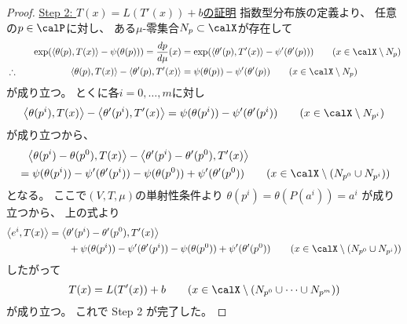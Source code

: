 \documentclass[report]{jlreq}
\begin{document}
\begin{proof}
    \uline{Step 2: $T(x) = L(T'(x)) + b$の証明} \quad
    指数型分布族の定義より、
    任意の$p \in \calP$に対し、
    ある$\mu$-零集合$N_p \subset \calX$が存在して
    \begin{alignat}{2}
        &\phantom{\therefore}& \quad
            \exp(\myangle{\theta(p)}{T(x)} - \psi(\theta(p)))
                =
                    \dd[p]{\mu}(x)
                &=
                    \exp(\myangle{\theta'(p)}{T'(x)} - \psi'(\theta'(p)))
                \qquad
                    (x \in \calX \setminus N_p)
            \\
        &\therefore& \quad
            \myangle{\theta(p)}{T(x)}
                - \myangle{\theta'(p)}{T'(x)}
                &=
                    \psi(\theta(p))
                    - \psi'(\theta'(p))
                \qquad
                    (x \in \calX \setminus N_p)
            \label{eq:pairings-and-log-partition}
    \end{alignat}
    が成り立つ。
    とくに各$i = 0, \dots, m$に対し
    \begin{equation}
        \myangle{\theta(p^i)}{T(x)}
            - \myangle{\theta'(p^i)}{T'(x)}
            =
                \psi(\theta(p^i))
                - \psi'(\theta'(p^i))
            \qquad
                (x \in \calX \setminus N_{p^i})
    \end{equation}
    が成り立つから、
    \begin{equation}
        \begin{alignedat}{1}
            &\phantom{=}
                \myangle{\theta(p^i) - \theta(p^0)}{T(x)}
                - \myangle{\theta'(p^i) - \theta'(p^0)}{T'(x)}
                \\
            &=
                \psi(\theta(p^i))
                - \psi'(\theta'(p^i))
                - \psi(\theta(p^0))
                + \psi'(\theta'(p^0))
                \qquad
                (x \in \calX \setminus (N_{p^0} \cup N_{p^i}))
        \end{alignedat}
    \end{equation}
    となる。
    ここで$(V, T, \mu)$の単射性条件より
    $\theta(p^i) = \theta(P(a^i)) = a^i$
    が成り立つから、
    上の式より
    \begin{equation}
        \begin{alignedat}{1}
            \myangle{e^i}{T(x)}
                &=
                    \myangle{\theta'(p^i) - \theta'(p^0)}{T'(x)}
                    \\
                &\qquad
                    + \psi(\theta(p^i))
                    - \psi'(\theta'(p^i))
                    - \psi(\theta(p^0))
                    + \psi'(\theta'(p^0))
                    \qquad
                    (x \in \calX \setminus (N_{p^0} \cup N_{p^i}))
        \end{alignedat}
    \end{equation}
    したがって
    \begin{equation}
        T(x) = L(T'(x)) + b
            \qquad
                (x \in \calX \setminus (N_{p^0} \cup \cdots \cup N_{p^m}))
    \end{equation}
    が成り立つ。
    これで Step 2 が完了した。


\end{proof}
\end{document}

